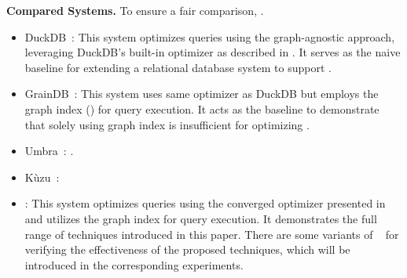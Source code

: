 \noindent\textbf{Compared Systems. }
To ensure a fair comparison, .

\begin{itemize}
\item DuckDB~\cite{duckdb}: This system optimizes queries using the graph-agnostic approach, leveraging DuckDB's built-in optimizer as described in . It serves as the naive baseline for extending a relational database system to support \spjm.

\item GrainDB~\cite{graindb}: This system uses same optimizer as DuckDB but employs the graph index () for query execution. It acts as the baseline to demonstrate that solely using graph index is insufficient for optimizing \spjm.


\item Umbra~\cite{umbra2020vldb,umbra2020cidr}: .

\item Kùzu~\cite{jin2023cidr}:

\item \name: This system optimizes queries using the converged optimizer presented in  and utilizes the graph index for query execution. It demonstrates the full range of techniques introduced in this paper. There are some variants
of \name~ for verifying the effectiveness of the proposed techniques, which will be introduced in the corresponding experiments.
\end{itemize}

